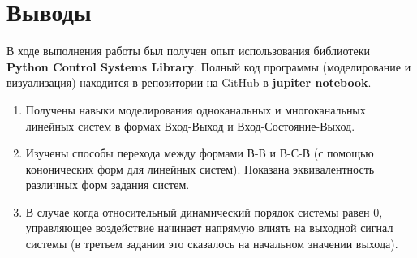 \section{Выводы}
В ходе выполнения работы был получен опыт использования библиотеки 
\textbf{Python Control Systems Library}. Полный код программы (моделирование 
и визуализация) находится в \href{https://github.com/diuzhevVlad/control-theory-itmo-fall-2023/tree/main/Lab1}
{репозитории} на GitHub в \textbf{jupiter notebook}.
\begin{enumerate}
    \item {
        Получены навыки моделирования одноканальных и многоканальных линейных 
        систем в формах Вход-Выход и Вход-Состояние-Выход.
    }
    \item {
        Изучены способы перехода между формами В-В и В-С-В (с помощью кононических
        форм для линейных систем). Показана эквивалентность различных форм задания систем.
    }
    \item {
        В случае когда относительный динамический порядок системы равен 0, управляющее
        воздействие начинает напрямую влиять на выходной сигнал системы (в третьем задании
         это сказалось на начальном значении выхода).
    }
\end{enumerate}

\pagebreak